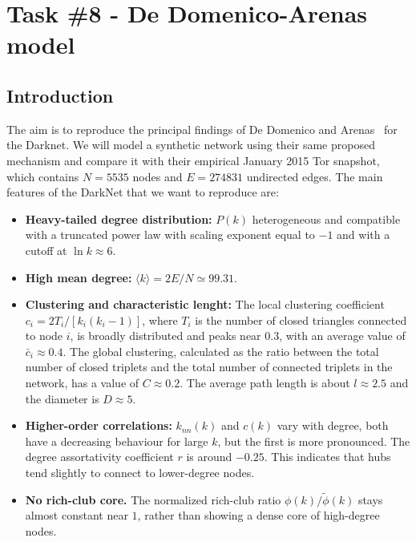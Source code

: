 \chapter{Task \#8 - De Domenico-Arenas model}

\begingroup\small

 

\section{Introduction}

The aim is to reproduce the principal findings of De Domenico and
Arenas~\cite{dedomenico2017darknet} for the Darknet. We will model a synthetic network using their same proposed mechanism and compare it with their empirical January 2015 Tor snapshot, which contains $N=5535$
nodes and $E=274831$ undirected edges. The main features of the DarkNet that we want to reproduce are:

\begin{itemize}[leftmargin=1.25em,itemsep=1.2pt,topsep=2pt]
  \item \textbf{Heavy-tailed degree distribution:} $P(k)$  heterogeneous and
  compatible with a truncated power law with scaling exponent equal to $-1$ and with a cutoff at $\ln k\approx 6$.
  \item \textbf{High mean degree:} $\langle k\rangle=2E/N\simeq99.31$.
  \item \textbf{Clustering and characteristic lenght:} The local clustering coefficient
  $c_i=2T_i/[k_i(k_i-1)]$, where $T_i$ is the number of closed triangles connected to node $i$, is broadly distributed and peaks near $0.3$, with an average value of $\bar c_i \approx 0.4$. 
  The global clustering, calculated as the ratio between the total number of closed triplets and the total number
 of connected triplets in the network, has a value of $C\approx 0.2$. The average path length is about $l\approx2.5$ and the diameter is $D\approx 5$. 
  \item \textbf{Higher-order correlations:} $k_{nn}(k)$ and $c(k)$ vary with
  degree, both have a decreasing behaviour for large $k$, but the first is more pronounced. The degree assortativity coefficient $r$ is around $-0.25$. This indicates that hubs tend slightly to
  connect to lower-degree nodes.
  \item \textbf{No rich-club core.} The normalized rich-club ratio $\phi(k)/\widetilde{\phi}(k)$ stays almost constant near $1$, rather than
  showing a dense core of high-degree nodes.
\end{itemize}


\endgroup
